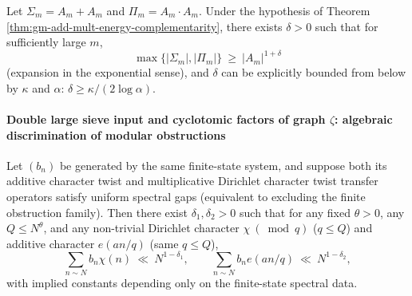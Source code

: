 \begin{proposition}
\begin{corollary}\label{cor:gm-sumproduct-exponent-law}
Let \(\Sigma_m=A_m+A_m\) and \(\Pi_m=A_m\cdot A_m\).
Under the hypothesis of Theorem \ref{thm:gm-add-mult-energy-complementarity}, there exists \(\delta>0\) such that for sufficiently large \(m\),
\[
\max\{|\Sigma_m|,|\Pi_m|\}\ \ge\ |A_m|^{1+\delta}
\]
(expansion in the exponential sense), and \(\delta\) can be explicitly bounded from below by \(\kappa\) and \(\alpha\):
\(
\delta\ge \kappa/(2\log\alpha)
\).
\end{corollary}

\paragraph{Double large sieve input and cyclotomic factors of graph \texorpdfstring{$\zeta$}{zeta}: algebraic discrimination of modular obstructions}
\begin{proposition}\label{prop:gm-double-large-sieve-input}
Let \((b_n)\) be generated by the same finite-state system, and suppose both its additive character twist and multiplicative Dirichlet character twist transfer operators satisfy uniform spectral gaps (equivalent to excluding the finite obstruction family).
Then there exist \(\delta_1,\delta_2>0\) such that for any fixed \(\theta>0\), any \(Q\le N^\theta\), and any non-trivial Dirichlet character \(\chi\ (\bmod q)\) (\(q\le Q\)) and additive character \(e(an/q)\) (same \(q\le Q\)),
\[
\sum_{n\sim N} b_n\chi(n)\ \ll\ N^{1-\delta_1},
\qquad
\sum_{n\sim N} b_n e(an/q)\ \ll\ N^{1-\delta_2},
\]
with implied constants depending only on the finite-state spectral data.
\end{proposition}


\end{proposition}
